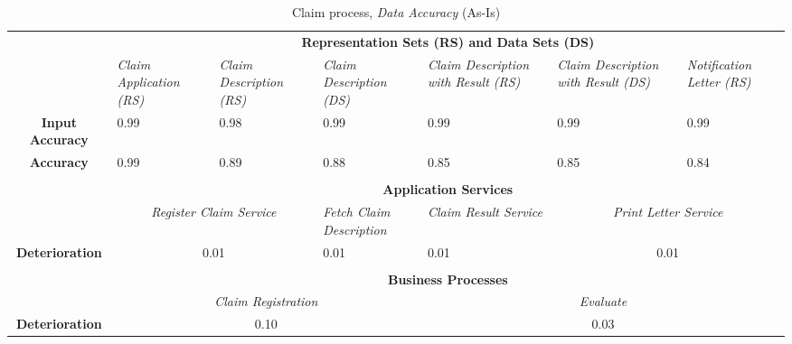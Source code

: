 \begin{center}
\begin{table}[H]
\begin{tabular}{c|p{1.5cm}|p{1.5cm}|p{1.5cm}|p{1.5cm}|p{1.5cm}|p{1.7cm}|}


\cline{2-7}
	 & \multicolumn{6}{c|}{\textbf{Representation Sets (RS) and Data Sets (DS)}} \\ \cline{2-7}
	 & \textsl{Claim Application (RS)} & \textsl{Claim Description (RS)} & \textsl{Claim Description (DS)} & \textsl{Claim Description with Result (RS)} & \textsl{Claim Description with Result (DS)} & \textsl{Notification Letter (RS)}\\
\hline
\multicolumn{1}{|c|}{\textbf{Input Accuracy}} & 0.99 & 0.98 & 0.99 & 0.99 & 0.99 & 0.99\\ \hline
\multicolumn{1}{|c|}{\textbf{Accuracy}} & 0.99 & 0.89 & 0.88 & 0.85 & 0.85 & 0.84\\ \hline

	\multicolumn{7}{c}{} \\ \cline{2-7}
	& \multicolumn{6}{c|}{\textbf{Application Services}} \\ \cline{2-7}
	& \multicolumn{2}{c|}{\textsl{Register Claim Service}} & \textsl{Fetch Claim Description} & \textsl{Claim Result Service} & \multicolumn{2}{c|}{\textsl{Print Letter Service}} \\ \hline
	\multicolumn{1}{|c|}{\textbf{Deterioration}} & \multicolumn{2}{c|}{0.01} & 0.01 & 0.01 & \multicolumn{2}{c|}{0.01} \\ \hline

	\multicolumn{7}{c}{} \\ \cline{2-7}
	& \multicolumn{6}{c|}{\textbf{Business Processes}} \\ \cline{2-7}
	& \multicolumn{3}{c|}{\textsl{Claim Registration}} & \multicolumn{3}{c|}{\textsl{Evaluate}} \\ \hline
	\multicolumn{1}{|c|}{\textbf{Deterioration}} & \multicolumn{3}{c|}{0.10} & \multicolumn{3}{c|}{0.03} \\ \hline
\end{tabular}
\caption{Claim process, \textsl{Data Accuracy} (As-Is)}
\label{tab:claim_as_is}
\end{table}
\end{center}